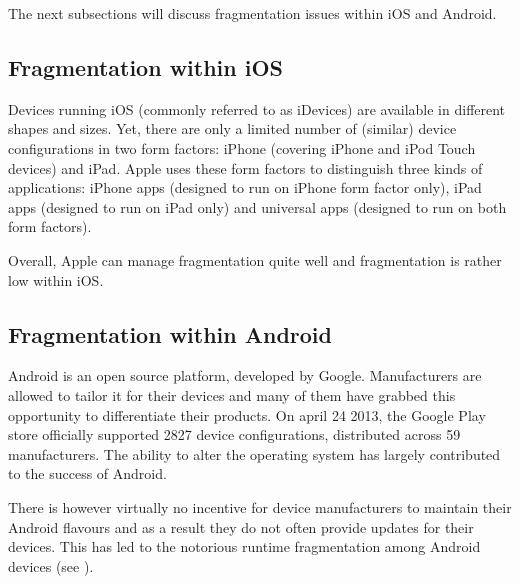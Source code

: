 The next subsections will discuss fragmentation issues within iOS and Android.

\subsection{Fragmentation within iOS}

Devices running iOS (commonly referred to as iDevices) are available in different shapes and sizes. Yet, there are only a limited number of (similar) device configurations in two form factors: iPhone (covering iPhone and iPod Touch devices) and iPad. Apple uses these form factors to distinguish three kinds of applications: iPhone apps (designed to run on iPhone form factor only), iPad apps (designed to run on iPad only) and universal apps (designed to run on both form factors). 


Overall, Apple can manage fragmentation quite well and fragmentation is rather low within iOS.

\subsection{Fragmentation within Android}

Android is an open source platform, developed by Google. Manufacturers are allowed to tailor it for their devices and many of them have grabbed this opportunity to differentiate their products. On april 24 2013, the Google Play store officially supported 2827 device configurations, distributed across 59 manufacturers. The ability to alter the operating system has largely contributed to the success of Android.

There is however virtually no incentive for device manufacturers to maintain their Android flavours and as a result they do not often provide updates for their devices. This has led to the notorious runtime fragmentation among Android devices (see ).

